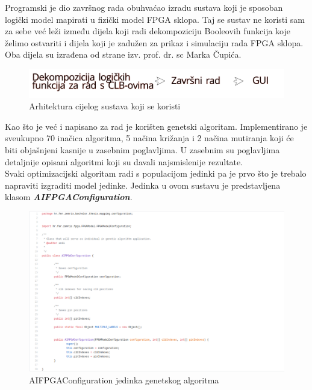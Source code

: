 \documentclass[times, utf8, zavrsni]{fer}
\begin{document}
Programski je dio završnog rada obuhvaćao izradu sustava koji je sposoban logički model mapirati u fizički model FPGA sklopa. Taj se sustav ne koristi sam za sebe već leži između dijela koji radi dekompoziciju Booleovih funkcija koje želimo ostvariti i dijela koji je zadužen za prikaz i simulaciju rada FPGA sklopa. Oba dijela su izrađena od strane izv. prof. dr. sc Marka Čupića. 

\begin{figure}[!htb]
	\centering
	\includegraphics[width=15cm]{slike/arhitekturaSustava.png}
	\caption{Arhitektura cijelog sustava koji se koristi}
	\label{fig:arh-sustav}
\end{figure}


Kao što je već i napisano za rad je korišten genetski algoritam. Implementirano je sveukupno 70 inačica algoritma, 5 načina križanja i 2 načina mutiranja koji će biti objašnjeni kasnije u zasebnim poglavljima. U zasebnim su poglavljima detaljnije opisani algoritmi koji su davali najsmislenije rezultate. \\
Svaki optimizacijski algoritam radi s populacijom jedinki pa je prvo što je trebalo napraviti izgraditi model jedinke. Jedinka u ovom sustavu je predstavljena klasom \textbf{\emph{AIFPGAConfiguration}}. 

\begin{figure}[!htb]
	\centering
	\includegraphics[width=18cm]{slike/AIFPGAConf.png}
	\caption{AIFPGAConfiguration jedinka genetskog algoritma}
	\label{fig:ai-fpga}
\end{figure}
\end{document}
